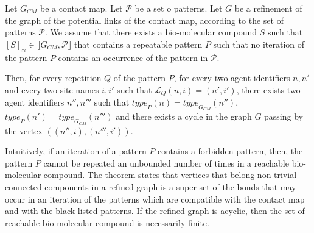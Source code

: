 \documentclass{entcs}
\newcommand{\graphsymb}{G}
\newcommand{\iso}{\approx}
\newcommand{\type}[1][\graphsymb]{\textit{type}_{#1}}
\newcommand{\links}[1][\graphsymb]{\mathcal{L}_{#1}}
\begin{document}
\begin{theorem}
  \label{th:linkbis}
  Let $\graphsymb_{\textit{CM}}$ be a contact map.
  Let $\mathcal{P}$ be a set o patterns.
  Let $G$ be a refinement of the graph of the potential links of the contact map, according to the set of patterns $\mathcal{P}$. We assume that there exists a bio-molecular compound $S$ such that $[S]_{\iso} \in \llbracket \graphsymb_{\textit{CM}}, \mathcal{P}\rrbracket$ that contains a repeatable pattern $P$ such that no iteration of the pattern $P$  contains an occurrence of the pattern in $\mathcal{P}$.

  Then, for every repetition $Q$ of the pattern $P$, for every two agent identifiers $n,n'$ and every two site names $i,i'$ such that $\links[Q](n,i)=(n',i')$, there exists two agent identifiers $n'',n'''$ such that $\type[P](n)=\type[\graphsymb_{\textit{CM}}](n'')$,
  $\type[P](n')=\type[\graphsymb_{\textit{CM}}](n''')$ and
  there exists a cycle in the graph $G$ passing by  the vertex $((n'',i),(n''',i'))$.
\end{theorem}

Intuitively, if an iteration of a pattern $P$ contains a forbidden pattern, then, the pattern $P$ cannot be repeated an unbounded number of times in a reachable bio-molecular compound. The theorem states that
vertices that belong non trivial connected components in a refined graph
is a super-set of the bonds that may occur in an iteration  of the patterns  which are compatible with the contact map and with the black-listed patterns. If the refined graph is acyclic, then
the set of reachable bio-molecular compound is necessarily finite.
\end{document}
